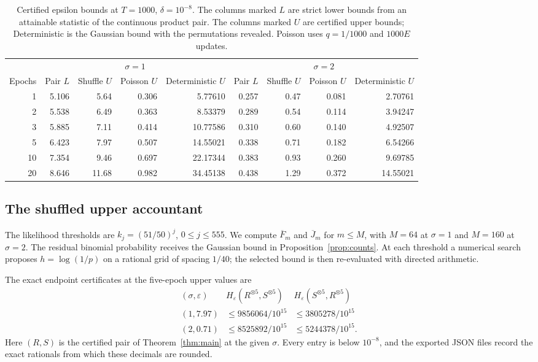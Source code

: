 \documentclass[conference]{IEEEtran}
\newcommand{\eps}{\varepsilon}
\begin{document}
\begin{table}[t]
\centering
\caption{Certified epsilon bounds at $T=1000$, $\delta=10^{-8}$. The columns marked $L$ are strict lower bounds from an attainable statistic of the continuous product pair. The columns marked $U$ are certified upper bounds; Deterministic is the Gaussian bound with the permutations revealed. Poisson uses $q=1/1000$ and $1000E$ updates.}
\label{tab:all}
\small
\begin{tabular}{r r r r r r r r r}
\toprule
&\multicolumn{4}{c}{$\sigma=1$}&\multicolumn{4}{c}{$\sigma=2$}\\
\cmidrule(lr){2-5}\cmidrule(lr){6-9}
Epochs&Pair $L$&Shuffle $U$&Poisson $U$&Deterministic $U$&Pair $L$&Shuffle $U$&Poisson $U$&Deterministic $U$\\
\midrule
1&5.106&5.64&0.306&5.77610&0.257&0.47&0.081&2.70761\\
2&5.538&6.49&0.363&8.53379&0.289&0.54&0.114&3.94247\\
3&5.885&7.11&0.414&10.77586&0.310&0.60&0.140&4.92507\\
5&6.423&7.97&0.507&14.55021&0.338&0.71&0.182&6.54266\\
10&7.354&9.46&0.697&22.17344&0.383&0.93&0.260&9.69785\\
20&8.646&11.68&0.982&34.45138&0.438&1.29&0.372&14.55021\\
\bottomrule
\end{tabular}
\end{table}

\subsection{The shuffled upper accountant}
The likelihood thresholds are $k_j=(51/50)^j$, $0\le j\le555$. We compute $\overline F_m$ and $\overline J_m$ for $m\le M$, with $M=64$ at $\sigma=1$ and $M=160$ at $\sigma=2$. The residual binomial probability receives the Gaussian bound in Proposition~\ref{prop:counts}. At each threshold a numerical search proposes $h=\log(1/p)$ on a rational grid of spacing $1/40$; the selected bound is then re-evaluated with directed arithmetic.

The exact endpoint certificates at the five-epoch upper values are
\begin{equation}\label{eq:numeric-cert}
\begin{array}{c|cc}
(\sigma,\eps)&H_\eps(R^{\otimes5},S^{\otimes5})&H_\eps(S^{\otimes5},R^{\otimes5})\\ \hline
(1,7.97)&\le9856064/10^{15}&\le3805278/10^{15}\\
(2,0.71)&\le8525892/10^{15}&\le5244378/10^{15}.
\end{array}
\end{equation}
Here $(R,S)$ is the certified pair of Theorem~\ref{thm:main} at the given $\sigma$. Every entry is below $10^{-8}$, and the exported JSON files record the exact rationals from which these decimals are rounded.
\end{document}
